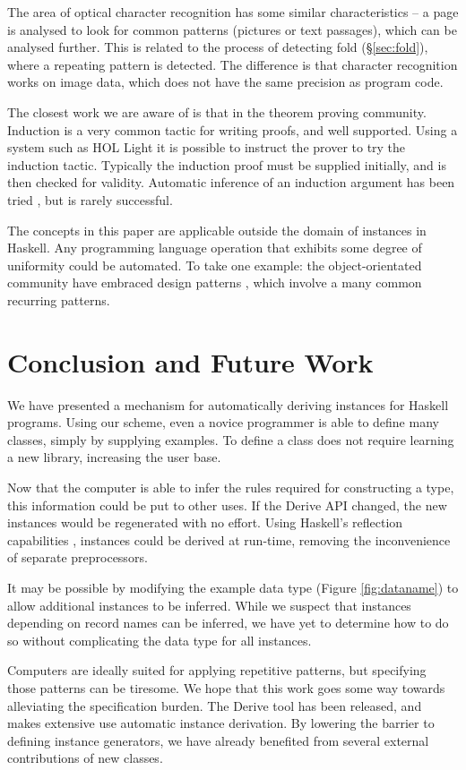 \documentclass{llncs}
\begin{document}
The area of optical character recognition \cite{ocr} has some similar characteristics -- a page is analysed to look for common patterns (pictures or text passages), which can be analysed further. This is related to the process of detecting fold (\S\ref{sec:fold}), where a repeating pattern is detected. The difference is that character recognition works on image data, which does not have the same precision as program code.

The closest work we are aware of is that in the theorem proving community. Induction is a very common tactic for writing proofs, and well supported. Using a system such as HOL Light \cite{hol_light} it is possible to instruct the prover to try the induction tactic. Typically the induction proof must be supplied initially, and is then checked for validity. Automatic inference of an induction argument has been tried \cite{mintchev:reasoning}, but is rarely successful.

The concepts in this paper are applicable outside the domain of instances in Haskell. Any programming language operation that exhibits some degree of uniformity could be automated. To take one example: the object-orientated community have embraced design patterns \cite{design_patterns}, which involve a many common recurring patterns.

\section{Conclusion and Future Work}
\label{sec:conclusion}

We have presented a mechanism for automatically deriving instances for Haskell programs. Using our scheme, even a novice programmer is able to define many classes, simply by supplying examples. To define a class does not require learning a new library, increasing the user base.

Now that the computer is able to infer the rules required for constructing a type, this information could be put to other uses. If the Derive API changed, the new instances would be regenerated with no effort. Using Haskell's reflection capabilities \cite{lammel:syb2}, instances could be derived at run-time, removing the inconvenience of separate preprocessors.

It may be possible by modifying the example data type (Figure \ref{fig:dataname}) to allow additional instances to be inferred. While we suspect that instances depending on record names can be inferred, we have yet to determine how to do so without complicating the data type for all instances.

Computers are ideally suited for applying repetitive patterns, but specifying those patterns can be tiresome. We hope that this work goes some way towards alleviating the specification burden. The Derive tool has been released, and makes extensive use automatic instance derivation. By lowering the barrier to defining instance generators, we have already benefited from several external contributions of new classes.



\end{document}
